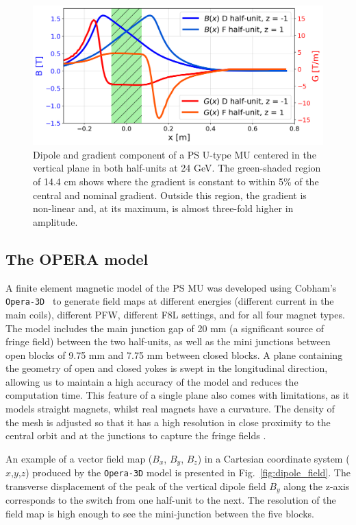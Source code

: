 \documentclass[a4paper,
               biblatex,     %
               keeplastbox,   %
               ]{jacow}
\begin{document}
\begin{figure}[!htb]
   \centering
   \includegraphics*[width=1.0\columnwidth, trim={0 0 0 0cm},clip]{MOPOTK030_f2.png}
   \caption{Dipole and gradient component of a  PS U-type MU centered in the vertical plane in both half-units at 24 GeV. The green-shaded region of 14.4 cm shows where the gradient is constant to within 5\% of the central and nominal gradient. Outside this region, the gradient is non-linear and, at its maximum, is almost three-fold higher in amplitude.}
   \label{fig:gradient_field}
\end{figure}

\subsection{The OPERA model}
A finite element magnetic model of the PS MU was developed using Cobham's \texttt{Opera-3D}~\cite{noauthor_opera_nodate, anglada_pxmu_hrcwp_nodate} to generate field maps at different energies (different current in the main coils), different PFW, different F8L settings, and for all four magnet types. The model includes the main junction gap of 20 mm (a significant source of fringe field) between the two half-units, as well as the mini junctions between open blocks of 9.75 mm and 7.75 mm between closed blocks. A plane containing the geometry of open and closed yokes is swept in the longitudinal direction, allowing us to maintain a high accuracy of the model and reduces the computation time. This feature of a single plane also comes with limitations, as it models straight magnets, whilst real magnets have a curvature. The density of the mesh is adjusted so that it has a high resolution in close proximity to the central orbit and at the junctions to capture the fringe fields \cite{anglada_reference_2019}.

An example of a vector field map ($B_x$, $B_y$, $B_z$) in a Cartesian coordinate system ($x$,$y$,$z$) produced by the \texttt{Opera-3D} model is presented in Fig.~\ref{fig:dipole_field}. The transverse displacement of the peak of the vertical dipole field $B_{y}$ along the z-axis corresponds to the switch from one half-unit to the next. The resolution of the field map is high enough to see the mini-junction between the five blocks.
\end{document}

